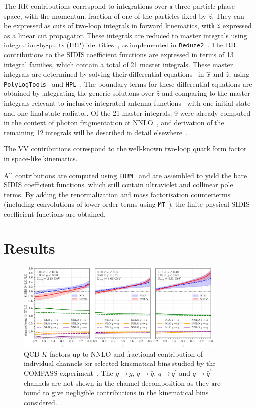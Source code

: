 \documentclass[10pt,aps,prl,twocolumn,preprintnumbers,nofootinbib]{revtex4-2}
\newcommand{\qp}{q^{\prime}}
\newcommand{\qbp}{\bar{q}^{\prime}}
\newcommand{\code}[1]{\texttt{#1}}
\begin{document}
The RR contributions correspond to integrations over a three-particle phase
space, with the momentum fraction of one of the particles fixed by
$\hat{z}$. They can be expressed as cuts of two-loop integrals in forward
kinematics, with $\hat{z}$ expressed as a linear cut propagator. These integrals
are reduced to master integrals using integration-by-parts (IBP)
identities~\cite{Chetyrkin:1981qh,Laporta:2000dsw}, as implemented in
\code{Reduze2}~\cite{vonManteuffel:2012np}.  The RR contributions to the SIDIS
coefficient functions are expressed in terms of 13 integral families, which
contain a total of 21 master integrals. These master integrals are determined by
solving their differential equations~\cite{Gehrmann:1999as} in $\hat{x}$ and
$\hat{z}$, using \code{PolyLogTools}~\cite{Duhr:2019tlz} and
\code{HPL}~\cite{Maitre:2005uu}. The boundary terms for these differential
equations are obtained by integrating the generic solutions over $\hat{z}$ and
comparing to the master integrals relevant to inclusive integrated antenna
functions~\cite{Daleo:2009yj} with one initial-state and one final-state
radiator.  Of the 21 master integrals, 9 were already computed in the context of
photon fragmentation at NNLO~\cite{Gehrmann:2022cih}, and derivation of the
remaining 12 integrals will be described in detail elsewhere~\cite{IFfrag}.

The VV contributions correspond to the well-known two-loop quark form
factor~\cite{Gehrmann:2005pd} in space-like kinematics.

All contributions are computed using \code{FORM}~\cite{Vermaseren:2000nd} and
are assembled to yield the bare SIDIS coefficient functions, which still contain
ultraviolet and collinear pole terms. By adding the renormalization and mass
factorization counterterms (including convolutions of lower-order terms using
\code{MT}~\cite{Hoschele:2013pvt}), the finite physical SIDIS coefficient
functions are obtained.


\section{Results}

\begin{figure}[t]
  \includegraphics[width=0.9\textwidth]{compass_theo-crop.pdf}
  \caption{QCD $K$-factors up to NNLO and fractional contribution of individual
    channels for selected kinematical bins studied by the COMPASS
    experiment~\protect\cite{COMPASS:2016xvm}. The $g \to g$, $q \to \bar{q}$,
    $q \to \qp$ and $q \to \qbp$ channels are not shown in the channel
    decomposition as they are found to give negligible contributions in the
    kinematical bins considered.}
  \label{fig:kfact}
\end{figure}
\end{document}
